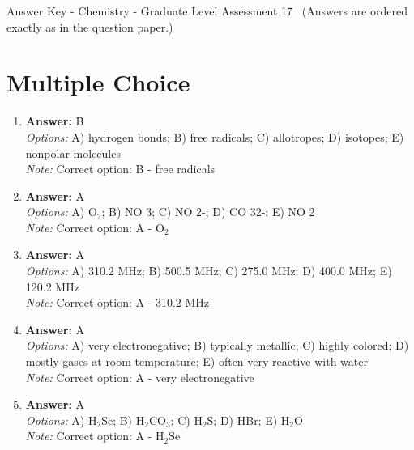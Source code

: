 \documentclass[12pt]{article}
\begin{document}
\begin{center}
Answer Key - Chemistry - Graduate Level Assessment 17 \
\small (Answers are ordered exactly as in the question paper.)
\end{center}

\section*{Multiple Choice}
\begin{enumerate}[label=\arabic*.]
\item \textbf{Answer:} B
\\ \textit{Options:} A) hydrogen bonds; B) free radicals; C) allotropes; D) isotopes; E) nonpolar molecules
\\ \textit{Note:} Correct option: B - free radicals
\item \textbf{Answer:} A
\\ \textit{Options:} A) O$_{2}$; B) NO 3; C) NO 2-; D) CO 32-; E) NO 2
\\ \textit{Note:} Correct option: A - O$_{2}$
\item \textbf{Answer:} A
\\ \textit{Options:} A) 310.2 MHz; B) 500.5 MHz; C) 275.0 MHz; D) 400.0 MHz; E) 120.2 MHz
\\ \textit{Note:} Correct option: A - 310.2 MHz
\item \textbf{Answer:} A
\\ \textit{Options:} A) very electronegative; B) typically metallic; C) highly colored; D) mostly gases at room temperature; E) often very reactive with water
\\ \textit{Note:} Correct option: A - very electronegative
\item \textbf{Answer:} A
\\ \textit{Options:} A) H$_{2}$Se; B) H$_{2}$CO$_{3}$; C) H$_{2}$S; D) HBr; E) H$_{2}$O
\\ \textit{Note:} Correct option: A - H$_{2}$Se
\end{enumerate}
\end{document}
